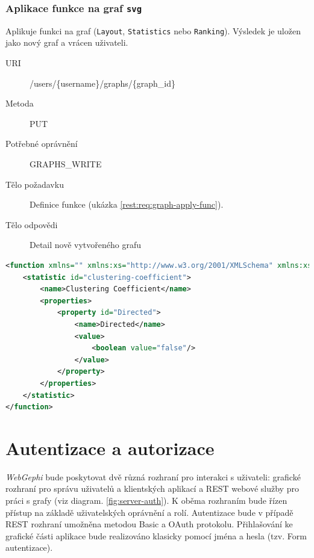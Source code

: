 \documentclass[thesis=M,czech]{FITthesis}[2014/05/6]
\begin{document}
\subsubsection{Aplikace funkce na graf \texttt{svg}}
Aplikuje funkci na graf (\texttt{Layout}, \texttt{Statistics} nebo \texttt{Ranking}). Výsledek je uložen jako nový graf a vrácen uživateli. 
\begin{description}
  \item[URI] /users/\{username\}/graphs/\{graph\_id\}
  \item[Metoda] PUT
  \item[Potřebné oprávnění] GRAPHS\_WRITE
  \item[Tělo požadavku] Definice funkce (ukázka \ref{rest:req:graph-apply-func}).
  \item[Tělo odpovědi] Detail nově vytvořeného grafu
\end{description}


\begin{lstlisting}[caption=Tělo požadavku zdroje /users/\{username\}/graphs/\{graph\_id\} (PUT), label=rest:req:graph-apply-func, language=xml]
<function xmlns="" xmlns:xs="http://www.w3.org/2001/XMLSchema" xmlns:xsi="http://www.w3.org/2001/XMLSchema-instance">
    <statistic id="clustering-coefficient">
        <name>Clustering Coefficient</name>
		<properties>
			<property id="Directed">
				<name>Directed</name>
				<value>
					<boolean value="false"/>
				</value>
			</property>
		</properties>
    </statistic>
</function>
\end{lstlisting}  

\section{Autentizace a autorizace}\label{roles}
\textit{WebGephi} bude poskytovat dvě různá rozhraní pro interakci s uživateli:
grafické rozhraní pro správu uživatelů a klientských aplikací a REST webové služby pro práci s grafy (viz diagram. \ref{fig:server-auth}).
K oběma rozhraním bude řízen přístup na základě uživatelských oprávnění a rolí. Autentizace bude v případě REST rozhraní umožněna metodou Basic a OAuth protokolu.
Přihlašování ke grafické části aplikace bude realizováno klasicky pomocí jména a hesla (tzv. Form autentizace).
\end{document}

